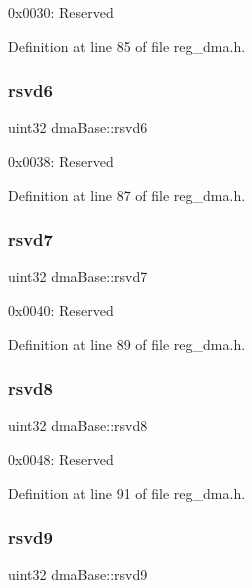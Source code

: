 0x0030\+: Reserved 

Definition at line 85 of file reg\+\_\+dma.\+h.

\mbox{\label{structdmaBase_a045387b1c26927424477521f46cd7890}} 
\subsubsection{\texorpdfstring{rsvd6}{rsvd6}}
{\footnotesize\ttfamily uint32 dma\+Base\+::rsvd6}

0x0038\+: Reserved 

Definition at line 87 of file reg\+\_\+dma.\+h.

\mbox{\label{structdmaBase_ab63a59f22a984938dcfd5204eab368de}} 
\subsubsection{\texorpdfstring{rsvd7}{rsvd7}}
{\footnotesize\ttfamily uint32 dma\+Base\+::rsvd7}

0x0040\+: Reserved 

Definition at line 89 of file reg\+\_\+dma.\+h.

\mbox{\label{structdmaBase_a6c1686dbc9c9a922ccb0303b8a0e087e}} 
\subsubsection{\texorpdfstring{rsvd8}{rsvd8}}
{\footnotesize\ttfamily uint32 dma\+Base\+::rsvd8}

0x0048\+: Reserved 

Definition at line 91 of file reg\+\_\+dma.\+h.

\mbox{\label{structdmaBase_a021fe4d9fb4a60d4a501fd3fbb174187}} 
\subsubsection{\texorpdfstring{rsvd9}{rsvd9}}
{\footnotesize\ttfamily uint32 dma\+Base\+::rsvd9}

